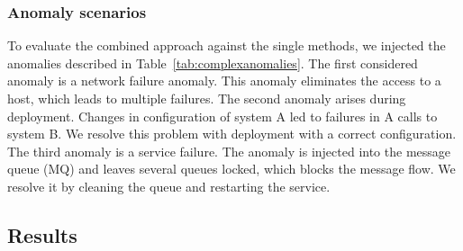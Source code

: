 \begin{table}[htbp]
\caption{Description of complex anomalies.}
\label{tab:complexanomalies}
\end{table}

\subsubsection{Anomaly scenarios}
To evaluate the combined approach against the single methods, we injected the anomalies described in Table~\ref{tab:complexanomalies}. 
The first considered anomaly is a network failure anomaly. This anomaly eliminates the access to a host, which leads to multiple failures. The second anomaly arises during deployment. Changes in configuration of system A led to failures in A calls to system B. We resolve this problem with deployment with a correct configuration. The third anomaly is a service failure. The anomaly is injected into the message queue (MQ) and leaves several queues locked, which blocks the message flow. We resolve it by cleaning the queue and restarting the service. 

\subsection{Results}


